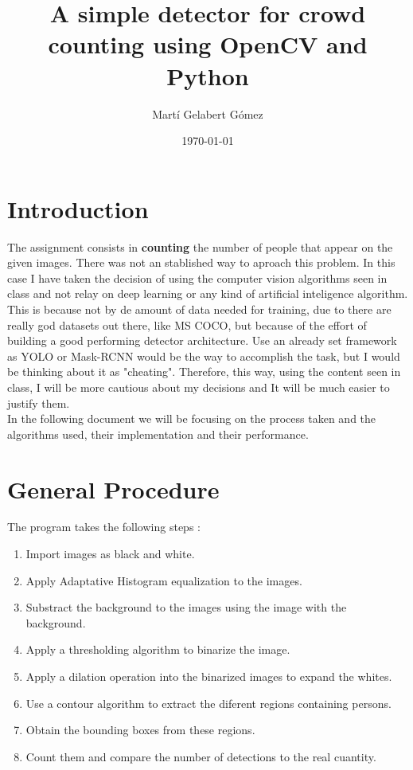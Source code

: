 \documentclass[11pt]{article}
\begin{document}
\title{A simple detector for crowd counting using OpenCV and Python}
\author{Martí Gelabert Gómez}
\date{\today}
\maketitle

\tableofcontents
\section{Introduction}
The assignment consists in \textbf{counting} the number of people that appear on the given images. There was not an stablished way to aproach this problem. In this case I have taken the decision of using the computer vision algorithms seen in class and not relay on deep learning or any kind of artificial inteligence algorithm. This is because not by de amount of data needed for training, due to there are really god datasets out there, like MS COCO, but because of the effort of building a good performing detector architecture. Use an already set framework as YOLO or Mask-RCNN would be the way to accomplish the task, but I would be thinking about it as "cheating". Therefore, this way, using the content seen in class, I will be more cautious about my decisions and It will be much easier to justify them.\\

In the following document  we will be focusing on the process taken and the algorithms used, their implementation and their performance.        

\section{General Procedure}
The program takes the following steps :

\begin{enumerate}
    \item Import images as black and white.
    \item Apply Adaptative Histogram equalization to the images.
    \item Substract the background to the images using the image with the background.
    \item Apply a thresholding algorithm to binarize the image.
    \item Apply a dilation operation into the binarized images to expand the whites.
    \item Use a contour algorithm to extract the diferent regions containing persons.
    \item Obtain the bounding boxes from these regions.
    \item Count them and compare the number of detections to the real cuantity.
    \end{enumerate}
    
\end{document}
